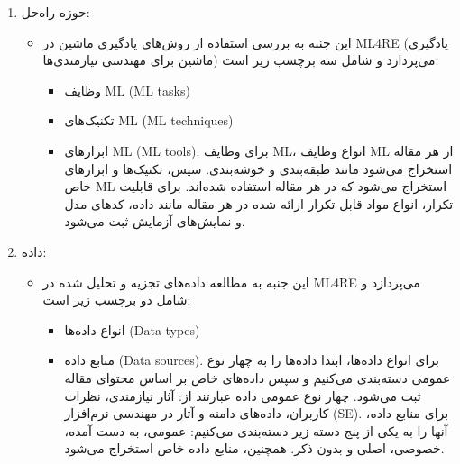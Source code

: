 \documentclass[a4paper,10pt]{article}
\begin{document}
\begin{enumerate}
                        \item حوزه راه‌حل:
                        \begin{itemize}
                            \item این جنبه به بررسی استفاده از روش‌های یادگیری ماشین در ML4RE (یادگیری ماشین برای مهندسی نیازمندی‌ها) می‌پردازد و شامل سه برچسب زیر است:
                            \begin{itemize}
                                \item وظایف ML (ML tasks)
                                \item تکنیک‌های ML (ML techniques)
                                \item ابزارهای ML (ML tools). برای وظایف ML، انواع وظایف ML از هر مقاله استخراج می‌شود مانند طبقه‌بندی و خوشه‌بندی. سپس، تکنیک‌ها و ابزارهای خاص ML استخراج می‌شود که در هر مقاله استفاده شده‌اند. برای قابلیت تکرار، انواع مواد قابل تکرار ارائه شده در هر مقاله مانند داده، کدهای مدل و نمایش‌های آزمایش ثبت می‌شود.
                            \end{itemize}
                        \end{itemize}
                        
                        \item داده:
                        \begin{itemize}
                            \item این جنبه به مطالعه داده‌های تجزیه و تحلیل شده در ML4RE می‌پردازد و شامل دو برچسب زیر است:
                            \begin{itemize}
                                \item انواع داده‌ها (Data types)
                                \item منابع داده (Data sources). برای انواع داده‌ها، ابتدا داده‌ها را به چهار نوع عمومی دسته‌بندی می‌کنیم و سپس داده‌های خاص بر اساس محتوای مقاله ثبت می‌شود. چهار نوع عمومی داده عبارتند از: آثار نیازمندی، نظرات کاربران، داده‌های دامنه و آثار در مهندسی نرم‌افزار (SE). برای منابع داده، آنها را به یکی از پنج دسته زیر دسته‌بندی می‌کنیم: عمومی، به دست آمده، خصوصی، اصلی و بدون ذکر. همچنین، منابع داده خاص استخراج می‌شود.
                            \end{itemize}
                        \end{itemize}
                        

\end{enumerate}
\end{document}
